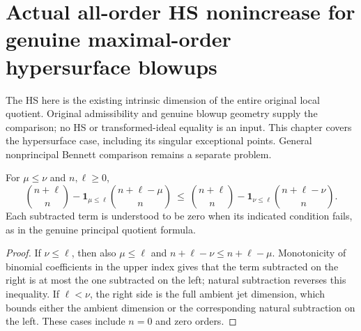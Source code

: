 \section{Actual all-order HS nonincrease for genuine maximal-order hypersurface blowups}

The HS here is the existing intrinsic dimension of the entire original
local quotient. Original admissibility and genuine blowup geometry supply
the comparison; no HS or transformed-ideal equality is an input. This
chapter covers the hypersurface case, including its singular exceptional
points. General nonprincipal Bennett comparison remains a separate problem.

\begin{lemma}
\label{hir:actual-principal-binomial-hs-monotone-order}
\leanok
{}
For $\mu\le\nu$ and $n,\ell\ge0$,
\[
 \binom{n+\ell}{n}-\mathbf1_{\mu\le\ell}\binom{n+\ell-\mu}{n}
 \ \le\ 
 \binom{n+\ell}{n}-\mathbf1_{\nu\le\ell}\binom{n+\ell-\nu}{n}.
\]
Each subtracted term is understood to be zero when its indicated condition
fails, as in the genuine principal quotient formula.
\end{lemma}
\begin{proof}
If $\nu\le\ell$, then also $\mu\le\ell$ and
$n+\ell-\nu\le n+\ell-\mu$. Monotonicity of binomial coefficients in
the upper index gives that the term subtracted on the right is at most
the one subtracted on the left; natural subtraction reverses this
inequality. If $\ell<\nu$, the right side is the full ambient jet
dimension, which bounds either the ambient dimension or the corresponding
natural subtraction on the left. These cases include $n=0$ and zero orders.
\end{proof}

